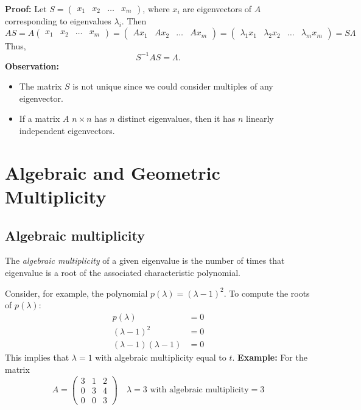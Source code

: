 \textbf{Proof:} Let \( S = \begin{pmatrix} x_1 & x_2 & \dots & x_m \end{pmatrix} \), where \( x_i \) are eigenvectors of \( A \) corresponding to eigenvalues \( \lambda_i \). Then
\[
AS = A\begin{pmatrix} x_1 & x_2 & \dots & x_m \end{pmatrix}
= \begin{pmatrix} Ax_1 &  Ax_2 & \dots &  Ax_m \end{pmatrix}
= \begin{pmatrix} \lambda_1 x_1 & \lambda_2 x_2 & \dots & \lambda_m x_m \end{pmatrix}
= S \Lambda
\]
Thus,
\[
S^{-1}AS = \Lambda.
\]
\textbf{Observation:}
\begin{itemize}
    \item The matrix \( S \) is not unique since we could consider multiples of any eigenvector.
    \item If a matrix \( A \) $n \times n$ has \( n \) distinct eigenvalues, then it has \( n \) linearly independent eigenvectors.
\end{itemize}

\section{Algebraic and Geometric Multiplicity}
\subsection{Algebraic multiplicity}
The \textit{algebraic multiplicity} of a given eigenvalue is the number of times that eigenvalue is a root of the associated characteristic polynomial.

Consider, for example, the polynomial $p(\lambda) = (\lambda - 1)^2$. To compute the roots of $p(\lambda)$:
\begin{align*}
p(\lambda) &= 0 \\
(\lambda - 1)^2 &= 0 \\
(\lambda - 1)(\lambda - 1) &= 0
\end{align*}
This implies that $\lambda = 1$ with algebraic multiplicity equal to $t$.
\textbf{Example:} 
For the matrix 
\[
A = 
\begin{pmatrix}
3 & 1 & 2 \\
0 & 3 & 4 \\
0 & 0 & 3 
\end{pmatrix}
\quad
\lambda = 3 \text{ with algebraic multiplicity} = 3
\]


